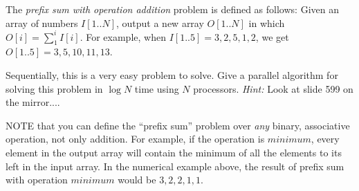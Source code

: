 The {\it prefix sum with operation addition} problem is defined as follows:
Given an array of numbers $I[1..N]$, output a new array $O[1..N]$  in which
$O[i] = \sum_1^i  I[i]$.
For example, when $I[1..5] = 3, 2, 5, 1, 2$, we get
$O[1..5] = 3, 5, 10, 11, 13$.

Sequentially, this is a very easy problem to solve. Give a parallel algorithm
for solving this problem in $\log  N$ time using $N$ processors.
{\em Hint:} Look at slide 599 on the mirror....

NOTE that you can define the ``prefix sum'' problem over {\em any} binary,
associative operation, not only addition.
For example, if the operation is $minimum$, every element in the output
array will contain the minimum of all the elements to its left in the
input array. In the numerical example above, the result 
of prefix sum with operation $minimum$ would be
$3, 2, 2, 1, 1$. 
